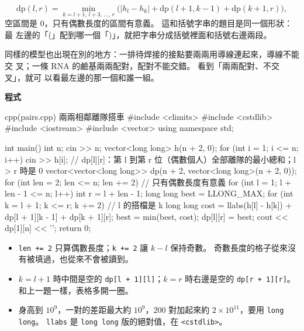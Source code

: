 \[
\mathrm{dp}(l, r) = \min_{k = l + 1,\, l + 3,\, \ldots,\, r} \bigl(|h_l - h_k| + \mathrm{dp}(l + 1, k - 1) + \mathrm{dp}(k + 1, r)\bigr),
\]
空區間是 $0$，只有偶數長度的區間有意義。 這和括號字串的題目是同一個形狀：最
左邊的「(」配到哪一個「)」，就把字串分成括號裡面和括號右邊兩段。

同樣的模型也出現在別的地方：一排待焊接的接點要兩兩用導線連起來，導線不能交
叉；一條 RNA 的鹼基兩兩配對，配對不能交錯。 看到「兩兩配對、不交叉」，就可
以看最左邊的那一個和誰一組。

\textbf{程式}

\begin{example}[label=ex:ivdp-pairs]{cpp}{(pairs.cpp) 兩兩相鄰離隊搭車}
#include <climits>
#include <cstdlib>
#include <iostream>
#include <vector>
using namespace std;

int main() {
    int n;
    cin >> n;
    vector<long long> h(n + 2, 0);
    for (int i = 1; i <= n; i++) {
        cin >> h[i];
    }
    // dp[l][r]：第 l 到第 r 位（偶數個人）全部離隊的最小總和；l > r 時是 0
    vector<vector<long long>> dp(n + 2, vector<long long>(n + 2, 0));
    for (int len = 2; len <= n; len += 2) {   // 只有偶數長度有意義
        for (int l = 1; l + len - 1 <= n; l++) {
            int r = l + len - 1;
            long long best = LLONG_MAX;
            for (int k = l + 1; k <= r; k += 2) {   // l 的搭檔是 k
                long long cost = llabs(h[l] - h[k]) + dp[l + 1][k - 1] + dp[k + 1][r];
                best = min(best, cost);
            }
            dp[l][r] = best;
        }
    }
    cout << dp[1][n] << '\n';
    return 0;
}
\end{example}


\begin{itemize}
\item \texttt{len += 2} 只算偶數長度；\texttt{k += 2} 讓 $k - l$ 保持奇數。
奇數長度的格子從來沒有被填過，也從來不會被讀到。
\item $k = l + 1$ 時中間是空的 \texttt{dp[l + 1][l]}；$k = r$ 時右邊是空的
\texttt{dp[r + 1][r]}。 和上一題一樣，表格多開一圈。
\item 身高到 $10^9$，一對的差距最大約 $10^9$，$200$ 對加起來約
$2 \times 10^{11}$，要用 \texttt{long long}。 \texttt{llabs} 是
\texttt{long long} 版的絕對值，在 \texttt{<cstdlib>}。
\end{itemize}

